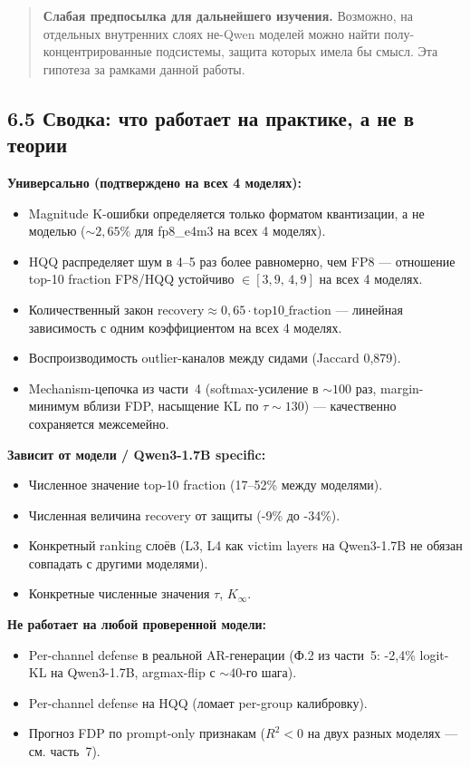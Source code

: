 \documentclass[a4paper,12pt]{article}
\begin{document}
\begin{quote}
\textbf{Слабая предпосылка для дальнейшего изучения.} Возможно, на
отдельных внутренних слоях не-Qwen моделей можно найти
полу-концентрированные подсистемы, защита которых имела бы смысл. Эта
гипотеза за рамками данной работы.
\end{quote}

\subsection*{6.5 Сводка: что работает на практике, а не в теории}

\textbf{Универсально (подтверждено на всех 4 моделях):}
\begin{itemize}[leftmargin=*]
\item Magnitude K-ошибки определяется только форматом квантизации,
  а не моделью ($\sim 2{,}65\%$ для fp8\_e4m3 на всех 4 моделях).
\item HQQ распределяет шум в 4--5 раз более равномерно, чем FP8 ---
  отношение top-10 fraction FP8/HQQ устойчиво $\in [3{,}9,\, 4{,}9]$ на
  всех 4 моделях.
\item Количественный закон \(\text{recovery} \approx 0{,}65 \cdot
  \text{top10\_fraction}\) --- линейная зависимость с одним
  коэффициентом на всех 4 моделях.
\item Воспроизводимость outlier-каналов между сидами (Jaccard 0,879).
\item Mechanism-цепочка из части~4 (softmax-усиление в $\sim 100$ раз,
  margin-минимум вблизи FDP, насыщение KL по $\tau \sim 130$) ---
  качественно сохраняется межсемейно.
\end{itemize}

\textbf{Зависит от модели / Qwen3-1.7B specific:}
\begin{itemize}[leftmargin=*]
\item Численное значение top-10 fraction (17--52\% между моделями).
\item Численная величина recovery от защиты (-9\% до -34\%).
\item Конкретный ranking слоёв (L3, L4 как victim layers на Qwen3-1.7B
  не обязан совпадать с другими моделями).
\item Конкретные численные значения $\tau$, $K_\infty$.
\end{itemize}

\textbf{Не работает на любой проверенной модели:}
\begin{itemize}[leftmargin=*]
\item Per-channel defense в реальной AR-генерации
  (Ф.2 из части~5: -2,4\% logit-KL на Qwen3-1.7B,
  argmax-flip с $\sim 40$-го шага).
\item Per-channel defense на HQQ (ломает per-group калибровку).
\item Прогноз FDP по prompt-only признакам ($R^2 < 0$ на двух разных
  моделях --- см. часть~7).
\end{itemize}
\end{document}
